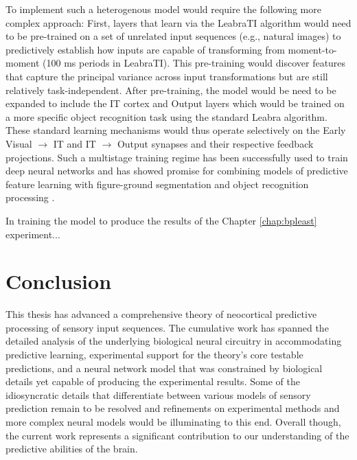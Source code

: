 \documentclass[dwyatte_dissertation.tex]{subfiles}
\begin{document}
To implement such a heterogenous model would require the following more complex approach: First, layers that learn via the LeabraTI algorithm would need to be pre-trained on a set of unrelated input sequences (e.g., natural images) to predictively establish how inputs are capable of transforming from moment-to-moment (100 ms periods in LeabraTI). This pre-training would discover features that capture the principal variance across input transformations but are still relatively task-independent. After pre-training, the model would be need to be expanded to include the IT cortex and Output layers which would be trained on a more specific object recognition task using the standard Leabra algorithm.  These standard learning mechanisms would thus operate selectively on the Early Visual $\rightarrow$ IT and IT $\rightarrow$ Output synapses and their respective feedback projections. Such a multistage training regime has been successfully used to train deep neural networks \cite{HintonSalakhutdinov06} and has showed promise for combining models of predictive feature learning with figure-ground segmentation and object recognition processing \cite{OReillyWyatteRohrlichEtAlInPrep}.


In training the model to produce the results of the Chapter \ref{chap:bpleast} experiment...
% 


\section{Conclusion}
This thesis has advanced a comprehensive theory of neocortical predictive processing of sensory input sequences. The cumulative work has spanned the detailed analysis of the underlying biological neural circuitry in accommodating predictive learning, experimental support for the theory's core testable predictions, and a neural network model that was constrained by biological details yet capable of producing the experimental results. Some of the idiosyncratic details that differentiate between various models of sensory prediction remain to be resolved and refinements on experimental methods and more complex neural models would be illuminating to this end. Overall though, the current work represents a significant contribution to our understanding of the predictive abilities of the brain.

%
%
\end{document}
